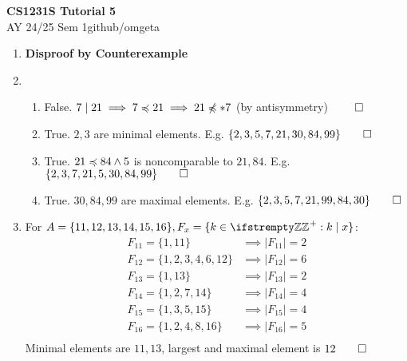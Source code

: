 \documentclass[12pt, a4paper]{article}
\newcommand{\mytitle}{CS1231S Tutorial 5}
\newcommand{\myauthor}{github/omgeta}
\newcommand{\mydate}{AY 24/25 Sem 1}
\begin{document}
\raggedright
\footnotesize
\begin{center}
{\normalsize{\textbf{\mytitle}}} \\
{\footnotesize{\mydate\hspace{2pt}\textemdash\hspace{2pt}\myauthor}}
\end{center}
\begin{enumerate}[Q\arabic*.]
  \item \textbf{Disproof by Counterexample}

  \item 
    \begin{enumerate}[(\alph*)]
      \item False. $7\mid 21 \implies 7 \preccurlyeq 21 \implies 21 \not\preccurlyeq* 7$ (by antisymmetry) $\qed$
      \item True. $2, 3$ are minimal elements. E.g. $\{2, 3, 5, 7, 21, 30, 84, 99\} \qed$
      \item True. $21 \preccurlyeq 84 \land 5$ is noncomparable to $21, 84$. E.g. $\{2, 3, 7, 21, 5, 30, 84, 99\} \qed$
      \item True. $30, 84, 99$ are maximal elements. E.g. $\{2, 3, 5, 7, 21, 99, 84, 30\} \qed$
    \end{enumerate}

  \item For $A = \{11,12,13,14,15,16\}, F_x = \{k\in\ZZ^+: k\mid x\}$:
    \begin{align*}
      F_{11} = \{1, 11\} &\implies |F_{11}| = 2\\
      F_{12} = \{1, 2, 3, 4, 6, 12\} &\implies |F_{12}| = 6\\
      F_{13} = \{1, 13\} &\implies |F_{13}| = 2\\
      F_{14} = \{1, 2, 7, 14\} &\implies |F_{14}| = 4\\
      F_{15} = \{1, 3, 5, 15\} &\implies |F_{15}| = 4\\
      F_{16} = \{1, 2, 4, 8, 16\} &\implies |F_{16}| = 5\\
    \end{align*}
    Minimal elements are $11, 13$, largest and maximal element is $12 \qed$


\end{enumerate}
\end{document}
